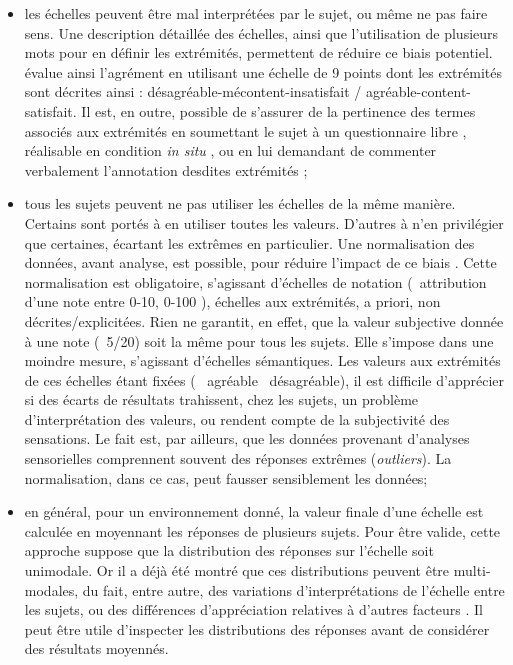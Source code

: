 \begin{itemize}
\item les échelles peuvent être mal interprétées par le sujet, ou même ne pas faire sens. Une description détaillée des échelles, ainsi que l'utilisation de plusieurs mots pour en définir les extrémités, permettent de réduire ce biais potentiel. \citep{hall2013exploratory} évalue ainsi l'agrément en utilisant une échelle de 9 points dont les extrémités sont décrites ainsi : désagréable-mécontent-insatisfait / agréable-content-satisfait. Il est, en outre, possible de s'assurer de la pertinence des termes associés aux extrémités en soumettant le sujet à un questionnaire libre \citep{guastavino2004perceptual}, réalisable en condition \emph{in situ} \citep{kang2010semantic,hong2013designing}, ou en lui demandant de commenter verbalement l'annotation desdites extrémités \citep{raimbault2006qualitative};

\item tous les sujets peuvent ne pas utiliser les échelles de la même manière. Certains sont portés à en utiliser toutes les valeurs. D'autres à n'en privilégier que certaines, écartant les extrêmes en particulier. Une normalisation des données, avant analyse, est possible, pour réduire l'impact de ce biais \citep{defreville2004aactivity,lavandier2006contribution,nielbo2013investigating,hong2013designing}. Cette normalisation est obligatoire, s'agissant d'échelles de notation (\eg~attribution d'une note entre 0-10, 0-100 \etc), échelles aux extrémités, a priori, non décrites/explicitées. Rien ne garantit, en effet, que la valeur subjective donnée à une note (\eg~5/20) soit la même pour tous les sujets. Elle s'impose dans une moindre mesure, s'agissant d'échelles sémantiques. Les valeurs aux extrémités de ces échelles étant fixées (\eg~ agréable \vs~désagréable), il est difficile d'apprécier si des écarts de résultats trahissent, chez les sujets, un problème d'interprétation des valeurs, ou rendent compte de la subjectivité des sensations. Le fait est, par ailleurs, que les données provenant d'analyses sensorielles comprennent souvent des réponses extrêmes (\emph{outliers}). La normalisation, dans ce cas, peut fausser sensiblement les données; 

\item en général, pour un environnement donné, la valeur finale d'une échelle est calculée en moyennant les réponses de plusieurs sujets. Pour être valide, cette approche suppose que la distribution des réponses sur l'échelle soit unimodale. Or il a déjà été montré que ces distributions peuvent être multi-modales, du fait, entre autre, des variations d'interprétations de l'échelle entre les sujets, ou des différences d'appréciation relatives à d'autres facteurs \citep{raimbault2006qualitative}. Il peut être utile d'inspecter les distributions des réponses avant de considérer des résultats moyennés.

\end{itemize}

